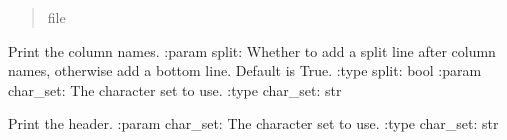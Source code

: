 \documentclass[letterpaper,10pt,english]{sphinxmanual}
\begin{document}
\begin{fulllineitems}
\begin{fulllineitems}
\begin{quote}
\begin{description}
\sphinxAtStartPar
file

\end{description}\end{quote}

\end{fulllineitems}


\begin{fulllineitems}
\label{\detokenize{nodes:nodes.nodePrinter.tablePrinter.print_column_names}}
\pysigstartsignatures
\pysiglinewithargsret
{}
{\sphinxparamcomma {}}
{}
\pysigstopsignatures
\sphinxAtStartPar
Print the column names.
:param split: Whether to add a split line after column names, otherwise add a bottom line. Default is True.
:type split: bool
:param char\_set: The character set to use.
:type char\_set: str

\end{fulllineitems}


\begin{fulllineitems}
\label{\detokenize{nodes:nodes.nodePrinter.tablePrinter.print_header}}
\pysigstartsignatures
\pysiglinewithargsret
{}
{}
{}
\pysigstopsignatures
\sphinxAtStartPar
Print the header.
:param char\_set: The character set to use.
:type char\_set: str

\end{fulllineitems}



\end{fulllineitems}
\end{document}
